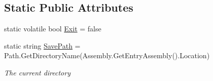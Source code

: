 \subsection*{Static Public Attributes}
\begin{DoxyCompactItemize}
\item 
static volatile bool \hyperlink{classOTA_1_1Globals_a1ca6f335e9c1353a51ecf18d1694f860}{Exit} = false
\item 
static string \hyperlink{classOTA_1_1Globals_afa83db25fd4b8853aafbb2625786d4a8}{Save\+Path} = Path.\+Get\+Directory\+Name(Assembly.\+Get\+Entry\+Assembly().Location)
\begin{DoxyCompactList}\small\item\em The current directory \end{DoxyCompactList}\end{DoxyCompactItemize}
